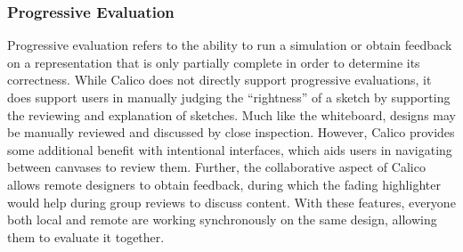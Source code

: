 

\subsubsection{Progressive Evaluation}
Progressive evaluation refers to the ability to run a simulation or obtain feedback on a representation that is only partially complete in order to determine its correctness. While Calico does not directly support progressive evaluations, it does support users in manually judging the ``rightness'' of a sketch by supporting the reviewing and explanation of sketches. Much like the whiteboard, designs may be manually reviewed and discussed by close inspection. However, Calico provides some additional benefit with intentional interfaces, which aids users in navigating between canvases to review them. Further, the collaborative aspect of Calico allows remote designers to obtain feedback, during which the fading highlighter would help during group reviews to discuss content. With these features, everyone both local and remote are working synchronously on the same design, allowing them to evaluate it together.



